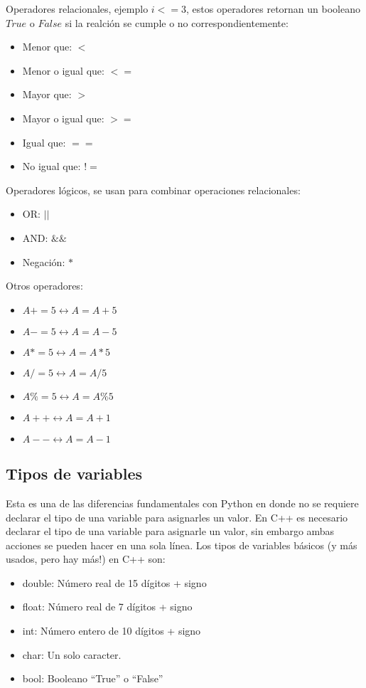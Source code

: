 \documentclass[10.5pt]{article}
\begin{document}

Operadores relacionales, ejemplo $i<=3$, estos operadores retornan un booleano $True$ o $False$ si la realción se cumple o no correspondientemente:
\begin{itemize}
\item Menor que: $<$
\item Menor o igual que: $<=$
\item Mayor que: $>$
\item Mayor o igual que: $>=$
\item Igual que: $==$
\item No igual que: $!=$
\end{itemize}

Operadores lógicos, se usan para combinar operaciones relacionales:
\begin{itemize}
\item OR: $||$
\item AND: $\&\&$
\item Negación: $*$
\end{itemize}

Otros operadores:
\begin{itemize}
\item $A+=5\leftrightarrow A=A+5$
\item $A-=5\leftrightarrow A=A-5$
\item $A*=5\leftrightarrow A=A*5$
\item $A/=5\leftrightarrow A=A/5$
\item $A\% =5\leftrightarrow A=A\% 5$
\item $A++\leftrightarrow A=A+1$
\item $A--\leftrightarrow A=A-1$
\end{itemize}

\subsection{Tipos de variables}

Esta es una de las diferencias fundamentales con Python en donde no se requiere declarar el tipo de una variable para asignarles un valor. En C++ es necesario declarar el tipo de una variable para asignarle un valor, sin embargo ambas acciones se pueden hacer en una sola línea. Los tipos de variables básicos (y más usados, pero hay más!) en C++ son:

\begin{itemize}
\item double: Número real de 15 dígitos + signo 
\item float: Número real de 7 dígitos + signo
\item int: Número entero de 10 dígitos + signo
\item char: Un solo caracter.
\item bool: Booleano ``True'' o ``False''
\end{itemize}
\end{document}
